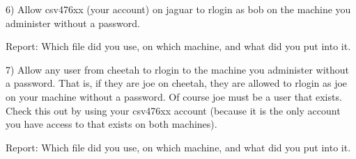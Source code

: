 6) Allow csv476xx (your account) on {\ltt{}jaguar} to rlogin as bob 
on the machine you administer without a password.

Report: Which file did you use, on which machine, and what did you put into it.

7) Allow any user from {\ltt{}cheetah} to rlogin to the machine you administer 
without a password.
That is, if they are joe on {\ltt{}cheetah}, they are allowed to rlogin as
joe on your
machine without a password. Of course joe must be  a user that exists.
Check this out by using your csv476xx account (because it is the only
account you have access to that exists on both machines).

Report: Which file did you use, on which machine, and what did you put into it.
\bye

